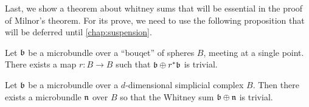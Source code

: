 \begin{myparagraph}
    Last, we show a theorem about whitney sums that will be essential in the proof of Milnor's theorem.
    For its prove, we need to use the following proposition that will be deferred until \autoref{chap:suspension}.
\end{myparagraph}

\begin{myproposition}\label{whitney::bouqet}
    Let $\mathfrak{b}$ be a microbundle over a ``bouqet'' of spheres $B$, meeting at a single point.
    There exists a map $r: B \to B$ such that $\mathfrak{b} \oplus r^*\mathfrak{b}$ is trivial.
\end{myproposition}

\begin{mytheorem}\label{whitney::theorem}
    Let $\mathfrak{b}$ be a microbundle over a $d$-dimensional simplicial complex $B$.
    Then there exists a microbundle $\mathfrak{n}$ over $B$ so that the Whitney sum $\mathfrak{b} \oplus \mathfrak{n}$ is trivial.
\end{mytheorem}
